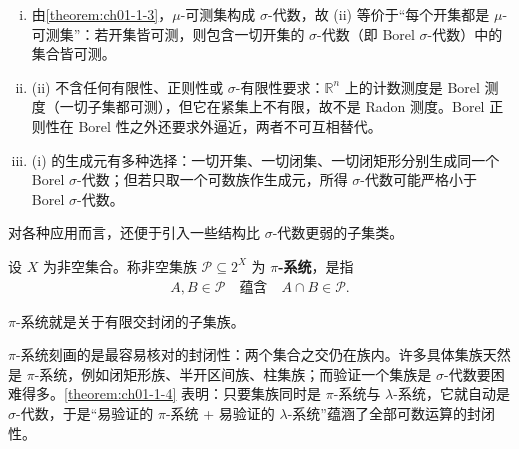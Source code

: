 \documentclass[../../main.tex]{subfiles}
\begin{document}
\begin{remark}\label{remark:ch01-def-1-6-拓扑条件}
\begin{enumerate}[(i)]
\item 由\cref{theorem:ch01-1-3}，$\mu$-可测集构成 $\sigma$-代数，故 (ii) 等价于“每个开集都是 $\mu$-可测集”：若开集皆可测，则包含一切开集的 $\sigma$-代数（即 Borel $\sigma$-代数）中的集合皆可测。%
\item (ii) 不含任何有限性、正则性或 $\sigma$-有限性要求：$\mathbb{R}^{n}$ 上的计数测度是 Borel 测度（一切子集都可测），但它在紧集上不有限，故不是 Radon 测度。Borel 正则性在 Borel 性之外还要求外逼近，两者不可互相替代。
\item (i) 的生成元有多种选择：一切开集、一切闭集、一切闭矩形分别生成同一个 Borel $\sigma$-代数；但若只取一个可数族作生成元，所得 $\sigma$-代数可能严格小于 Borel $\sigma$-代数。
\end{enumerate}
\end{remark}

对各种应用而言，还便于引入一些结构比 $\sigma$-代数更弱的子集类。

\begin{definition}[$\pi$-系统]\label{definition:ch01-1-7}
设 $X$ 为非空集合。称非空集族 $\mathcal{P}\subseteq2^{X}$ 为 \textbf{$\pi$-系统}，是指
\begin{align*}
A,B\in\mathcal{P}\quad\text{蕴含}\quad A\cap B\in\mathcal{P}.
\end{align*}
\end{definition}

$\pi$-系统就是关于有限交封闭的子集族。

\begin{remark}\label{remark:ch01-def-1-7-系统动机}
$\pi$-系统刻画的是最容易核对的封闭性：两个集合之交仍在族内。许多具体集族天然是 $\pi$-系统，例如闭矩形族、半开区间族、柱集族；而验证一个集族是 $\sigma$-代数要困难得多。\cref{theorem:ch01-1-4} 表明：只要集族同时是 $\pi$-系统与 $\lambda$-系统，它就自动是 $\sigma$-代数，于是“易验证的 $\pi$-系统 + 易验证的 $\lambda$-系统”蕴涵了全部可数运算的封闭性。%
\end{remark}
\end{document}
